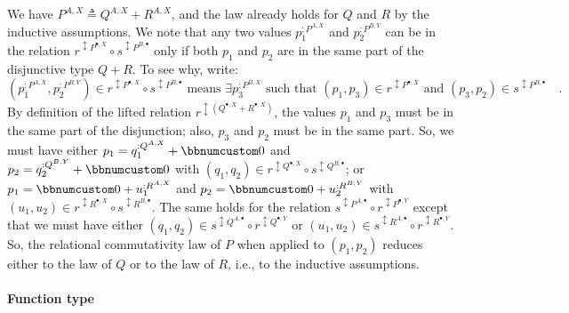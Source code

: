 We have $P^{A,X}\triangleq Q^{A,X}+R^{A,X}$, and the law already
holds for $Q$ and $R$ by the inductive assumptions. We note that
any two values $p_{1}^{:P^{A,X}}$ and $p_{2}^{:P^{B,Y}}$ can be
in the relation $r^{\updownarrow P^{\bullet,X}}\circ s^{\updownarrow P^{B,\bullet}}$
only if both $p_{1}$ and $p_{2}$ are in the same part of the disjunctive
type $Q+R$. To see why, write:
\[
(p_{1}^{:P^{A,X}},p_{2}^{:P^{B,Y}})\in r^{\updownarrow P^{\bullet,X}}\circ s^{\updownarrow P^{B,\bullet}}\text{ means }\exists p_{3}^{:P^{B,X}}\text{ such that }(p_{1},p_{3})\in r^{\updownarrow P^{\bullet,X}}\text{ and }(p_{3},p_{2})\in s^{\updownarrow P^{B,\bullet}}\quad.
\]
By definition of the lifted relation $r^{\updownarrow(Q^{\bullet,X}+R^{\bullet,X})}$,
the values $p_{1}$ and $p_{3}$ must be in the same part of the disjunction;
also, $p_{3}$ and $p_{2}$ must be in the same part. So, we must
have either $p_{1}=q_{1}^{:Q^{A,X}}+\bbnum 0$ and $p_{2}=q_{2}^{:Q^{B,Y}}+\bbnum 0$
with $(q_{1},q_{2})\in r^{\updownarrow Q^{\bullet,X}}\circ s^{\updownarrow Q^{B,\bullet}}$;
or $p_{1}=\bbnum 0+u_{1}^{:R^{A,X}}$ and $p_{2}=\bbnum 0+u_{2}^{:R^{B,Y}}$
with $(u_{1},u_{2})\in r^{\updownarrow R^{\bullet,X}}\circ s^{\updownarrow R^{B,\bullet}}$.
The same holds for the relation $s^{\updownarrow P^{A,\bullet}}\circ r^{\updownarrow P^{\bullet,Y}}$
except that we must have either $(q_{1},q_{2})\in s^{\updownarrow Q^{A,\bullet}}\circ r^{\updownarrow Q^{\bullet,Y}}$
or $(u_{1},u_{2})\in s^{\updownarrow R^{A,\bullet}}\circ r^{\updownarrow R^{\bullet,Y}}$.
So, the relational commutativity law of $P$ when applied to $\left(p_{1},p_{2}\right)$
reduces either to the law of $Q$ or to the law of $R$, i.e., to
the inductive assumptions.

\paragraph{Function type}

